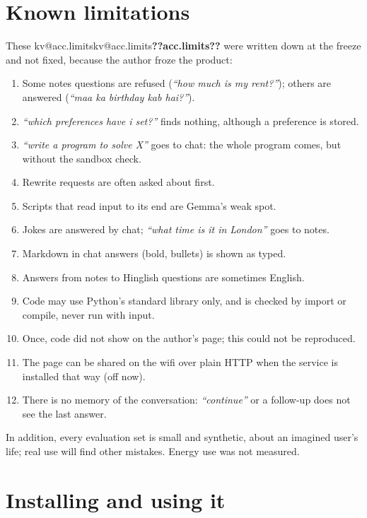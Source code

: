 \documentclass[11pt,a4paper]{article}
\makeatletter
\DeclareRobustCommand{\kv}[1]{\ifcsname kv@#1\endcsname\csname kv@#1\endcsname\else\textbf{??#1??}\fi}
\newcommand{\req}[1]{\textit{``#1''}}
\makeatother
\begin{document}
\section{Known limitations}\label{sec:limits}

These \kv{acc.limits} were written down at the freeze and not fixed, because the author froze the product:
\begin{enumerate}
  \item Some notes questions are refused (\req{how much is my rent?}); others are answered (\req{maa ka birthday kab hai?}).
  \item \req{which preferences have i set?} finds nothing, although a preference is stored.
  \item \req{write a program to solve X} goes to chat: the whole program comes, but without the sandbox check.
  \item Rewrite requests are often asked about first.
  \item Scripts that read input to its end are Gemma's weak spot.
  \item Jokes are answered by chat; \req{what time is it in London} goes to notes.
  \item Markdown in chat answers (bold, bullets) is shown as typed.
  \item Answers from notes to Hinglish questions are sometimes English.
  \item Code may use Python's standard library only, and is checked by import or compile, never run with input.
  \item Once, code did not show on the author's page; this could not be reproduced.
  \item The page can be shared on the wifi over plain HTTP when the service is installed that way (off now).
  \item There is no memory of the conversation: \req{continue} or a follow-up does not see the last answer.
\end{enumerate}
In addition, every evaluation set is small and synthetic, about an imagined user's life; real use will find other
mistakes. Energy use was not measured.

\section{Installing and using it}
\end{document}
